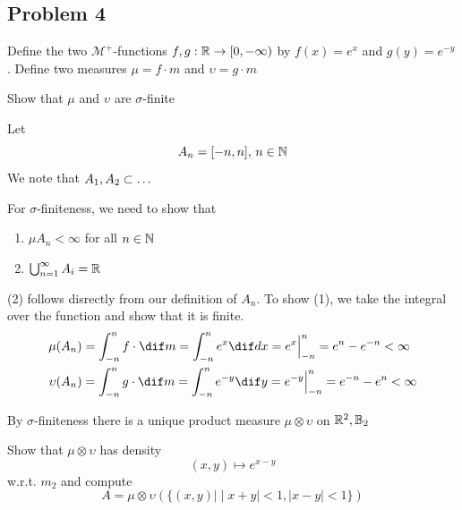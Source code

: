 \subsection{Problem 4} %
\label{sub:problem_4}
Define the two \(\mathcal{M^+}\)-functions \(f,g:{\mathbb{R}} \rightarrow[0,-\infty)\) by \(f(x)=e^x\) and \(g(y)=e^{-y}\). Define two measures \(\mu=f\cdot m\) and \(\upsilon=g\cdot m\)
\begin{problem}
Show that \(\mu\) and \(\upsilon\) are \(\sigma\)-finite
\end{problem}
\begin{solution}
Let
\[
	A_n=[-n,n], \, n\in {\mathbb{N}}
\]
We note that \(A_1, A_2 \subset \ldots\)

For \(\sigma\)-finiteness, we need to show that
\begin{enumerate}
  	\item \(\mu A_n<\infty\) for all \(n\in{\mathbb{N}}\)
  	\item \(\bigcup_{n=1}^\infty A_i={\mathbb{R}}\)
  \end{enumerate}
(2) follows disrectly from our definition of  \(A_n\). To show (1), we take the integral over the function and show that it is finite.
\begin{align*}
    \mu(A_n) & =\int_{-n}^n f\cdot \dif m=\int_{-n}^n e^x \dif dx = e^x\Big|_{-n}^n =e^n-e^{-n}<\infty \\
      \upsilon(A_n) & =\int_{-n}^n g\cdot \dif m=\int_{-n}^n e^{-y} \dif y = e^{-y}\Big|_{-n}^n =e^{-n}-e^n<\infty
\end{align*}

\end{solution}
By \(\sigma\)-finiteness there is a unique product measure \(\mu\otimes\upsilon\) on \({\mathbb{R}}^2,{\mathbb{B}}_2\)
\begin{problem}
Show that \(\mu\otimes\upsilon\) has density
\[
	(x,y)\mapsto e^{x-y}
\]
w.r.t. \(m_2\) and compute
\[
	A=\mu\otimes\upsilon(\{(x,y)\big| \mid x+y\mid <1,\mid x-y\mid<1\})
\]
\end{problem}
